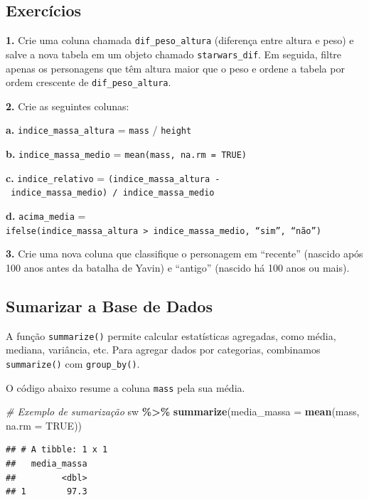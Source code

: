 \documentclass[
]{book}
\newenvironment{Shaded}{\begin{snugshade}}{\end{snugshade}}
\newcommand{\AttributeTok}[1]{\textcolor[rgb]{0.13,0.29,0.53}{#1}}
\newcommand{\CommentTok}[1]{\textcolor[rgb]{0.56,0.35,0.01}{\textit{#1}}}
\newcommand{\ConstantTok}[1]{\textcolor[rgb]{0.56,0.35,0.01}{#1}}
\newcommand{\FunctionTok}[1]{\textcolor[rgb]{0.13,0.29,0.53}{\textbf{#1}}}
\newcommand{\NormalTok}[1]{#1}
\newcommand{\SpecialCharTok}[1]{\textcolor[rgb]{0.81,0.36,0.00}{\textbf{#1}}}
\begin{document}
\subsection{Exercícios}\label{exercuxedcios-17}

\textbf{1.} Crie uma coluna chamada \texttt{dif\_peso\_altura} (diferença entre altura
e peso) e salve a nova tabela em um objeto chamado \texttt{starwars\_dif}. Em
seguida, filtre apenas os personagens que têm altura maior que o peso e
ordene a tabela por ordem crescente de \texttt{dif\_peso\_altura}.

\textbf{2.} Crie as seguintes colunas:

\textbf{a.} \texttt{indice\_massa\_altura} = \texttt{mass} / \texttt{height}

\textbf{b.} \texttt{indice\_massa\_medio} = \texttt{mean(mass,\ na.rm\ =\ TRUE)}

\textbf{c.} \texttt{indice\_relativo} =
\texttt{(indice\_massa\_altura\ -\ indice\_massa\_medio)\ /\ indice\_massa\_medio}

\textbf{d.} \texttt{acima\_media} =
\texttt{ifelse(indice\_massa\_altura\ \textgreater{}\ indice\_massa\_medio,\ “sim”,\ “não”)}

\textbf{3.} Crie uma nova coluna que classifique o personagem em ``recente''
(nascido após 100 anos antes da batalha de Yavin) e ``antigo'' (nascido há
100 anos ou mais).

\subsection{Sumarizar a Base de Dados}\label{sumarizar-a-base-de-dados}

A função \texttt{summarize()} permite calcular estatísticas agregadas, como
média, mediana, variância, etc. Para agregar dados por categorias,
combinamos \texttt{summarize()} com \texttt{group\_by()}.

O código abaixo resume a coluna \texttt{mass} pela sua média.

\begin{Shaded}
\begin{Highlighting}[]
\CommentTok{\# Exemplo de sumarização}
\NormalTok{sw }\SpecialCharTok{\%\textgreater{}\%} \FunctionTok{summarize}\NormalTok{(}\AttributeTok{media\_massa =} \FunctionTok{mean}\NormalTok{(mass, }\AttributeTok{na.rm =} \ConstantTok{TRUE}\NormalTok{))}
\end{Highlighting}
\end{Shaded}

\begin{verbatim}
## # A tibble: 1 x 1
##   media_massa
##         <dbl>
## 1        97.3
\end{verbatim}
\end{document}
